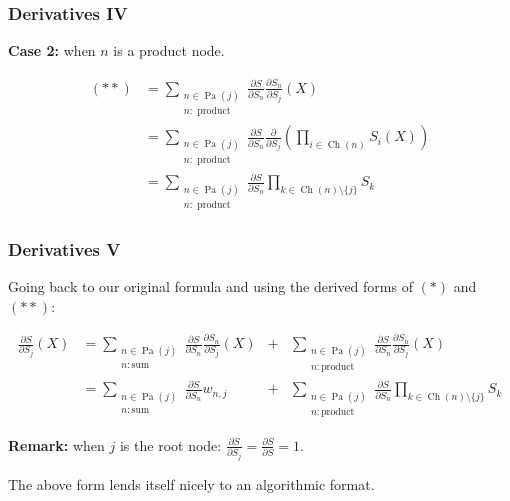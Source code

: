 \documentclass[usenames,dvipsnames]{beamer}
\DeclareMathOperator*{\Ch}{\text{Ch}}
\DeclareMathOperator*{\Pa}{\text{Pa}}
\newcommand{\ddspn}[2]{\frac{\partial#1}{\partial#2}}
\begin{document}
\begin{frame}
  \frametitle{Derivatives IV}

  \textbf{Case 2:} when $n$ is a product node.

  \begin{align*}
    (\ast\ast)&=\sum_{\substack{n\in\Pa(j)\\n:\text{ product}}}\ddspn{S}{S_n}\ddspn{S_n}{S_j}(X)\\
      &=\sum_{\substack{n\in\Pa(j)\\n:\text{ product}}}\ddspn{S}{S_n}\ddspn{}{S_j}\left(\prod_{i\in\Ch(n)}
      S_i(X)\right)\\
      &=\sum_{\substack{n\in\Pa(j)\\n:\text{ product}}}\ddspn{S}{S_n}\prod_{k\in
      \Ch(n)\setminus\{j\}}S_k
  \end{align*}
\end{frame}

\begin{frame}
  \frametitle{Derivatives V}

  Going back to our original formula and using the derived forms of $(\ast)$ and $(\ast\ast)$:

  \begin{align*}
    \ddspn{S}{S_j}(X)&=\sum_{\substack{n\in\Pa(j)\\n:\text{
          sum}}}\ddspn{S}{S_n}\ddspn{S_n}{S_j}(X)&+&\sum_{\substack{n\in\Pa(j)\\n:\text{
      product}}}\ddspn{S}{S_n}\ddspn{S_n}{S_j}(X)\\
                     &=\sum_{\substack{n\in\Pa(j)\\n:\text{
          sum}}}\ddspn{S}{S_n}w_{n,j}&+&\sum_{\substack{n\in\Pa(j)\\n:\text{
                       product}}}\ddspn{S}{S_n}\prod_{k\in \Ch(n)\setminus\{j\}}S_k
  \end{align*}

  \begin{center}
    \textbf{Remark:} when $j$ is the root node: $\ddspn{S}{S_j}=\ddspn{S}{S}=1$.
  \end{center}

  The above form lends itself nicely to an algorithmic format.
\end{frame}
\end{document}
